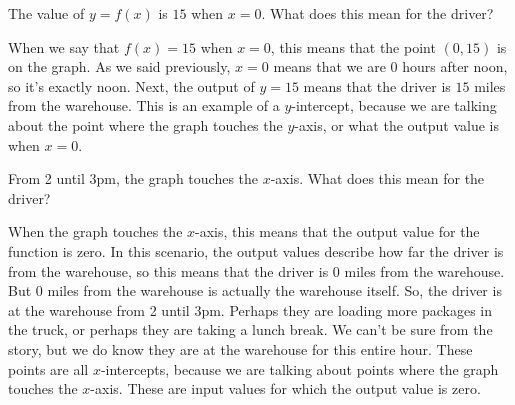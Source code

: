 \documentclass{ximera}
\begin{document}
\begin{example}
The value of $y = f(x)$ is $15$ when $x=0$. What does this mean for the driver?
\begin{multipleChoice}
\begin{feedback}[correct]
When we say that $f(x) = 15$ when $x=0$, this means that the point $(0,15)$ is on the graph. As we said previously, $x=0$ means that we are $0$ hours after noon, so it's exactly noon. Next, the output of $y=15$ means that the driver is $15$ miles from the warehouse. This is an example of a $y$-intercept, because we are talking about the point where the graph touches the $y$-axis, or what the output value is when $x=0$.
\end{feedback}
\end{multipleChoice}

From 2 until 3pm, the graph touches the $x$-axis. What does this mean for the driver?
\begin{multipleChoice}
\begin{feedback}[correct]
When the graph touches the $x$-axis, this means that the output value for the function is zero. In this scenario, the output values describe how far the driver is from the warehouse, so this means that the driver is $0$ miles from the warehouse. But $0$ miles from the warehouse is actually the warehouse itself. So, the driver is at the warehouse from 2 until 3pm. Perhaps they are loading more packages in the truck, or perhaps they are taking a lunch break. We can't be sure from the story, but we do know they are at the warehouse for this entire hour. These points are all $x$-intercepts, because we are talking about points where the graph touches the $x$-axis. These are input values for which the output value is zero.
\end{feedback}
\end{multipleChoice}


\end{example}
\end{document}
